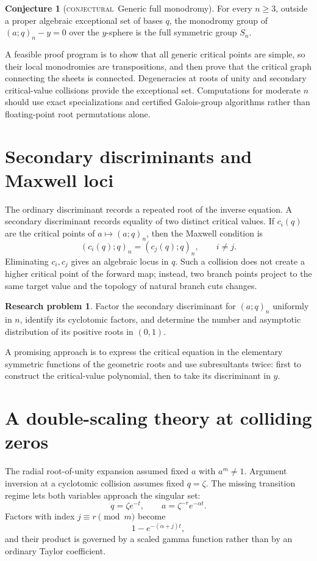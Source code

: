 \documentclass[11pt,letterpaper,oneside,openany]{book}
\theoremstyle{definition}
\newtheorem{researchproblem}[theorem]{Research problem}
\newtheorem{conjecture}[theorem]{Conjecture}
\theoremstyle{remark}
\newcommand{\statusconjectural}{\textcolor{conjectureorange}{\textsc{conjectural}}}
\begin{document}
\begin{conjecture}[\statusconjectural\ Generic full monodromy]
For every \(n\ge3\), outside a proper algebraic exceptional set of bases \(q\),
the monodromy group of \((a;q)_n-y=0\) over the \(y\)-sphere is the full
symmetric group \(S_n\).
\end{conjecture}
A feasible proof program is to show that all generic critical points are
simple, so their local monodromies are transpositions, and then prove that the
critical graph connecting the sheets is connected.  Degeneracies at roots of
unity and secondary critical-value collisions provide the exceptional set.
Computations for moderate \(n\) should use exact specializations and certified
Galois-group algorithms rather than floating-point root permutations alone.

\section{Secondary discriminants and Maxwell loci}
The ordinary discriminant records a repeated root of the inverse equation.  A
secondary discriminant records equality of two distinct critical values.  If
\(c_i(q)\) are the critical points of \(a\mapsto(a;q)_n\), then the Maxwell
condition is
\[
 (c_i(q);q)_n=(c_j(q);q)_n,
 \qquad i\ne j.
\]
Eliminating \(c_i,c_j\) gives an algebraic locus in \(q\).  Such a collision
does not create a higher critical point of the forward map; instead, two branch
points project to the same target value and the topology of natural branch
cuts changes.

\begin{researchproblem}
Factor the secondary discriminant for \((a;q)_n\) uniformly in \(n\), identify
its cyclotomic factors, and determine the number and asymptotic distribution of
its positive roots in \((0,1)\).
\end{researchproblem}
A promising approach is to express the critical equation in the elementary
symmetric functions of the geometric roots and use subresultants twice: first
to construct the critical-value polynomial, then to take its discriminant in
\(y\).

\section{A double-scaling theory at colliding zeros}
The radial root-of-unity expansion assumed fixed \(a\) with \(a^m\ne1\).
Argument inversion at a cyclotomic collision assumes fixed \(q=\zeta\).  The
missing transition regime lets both variables approach the singular set:
\[
 q=\zeta e^{-t},
 \qquad
 a=\zeta^{-r}e^{-\alpha t}.
\]
Factors with index \(j\equiv r\pmod m\) become
\[
 1-e^{-(\alpha+j)t},
\]
and their product is governed by a scaled gamma function rather than by an
ordinary Taylor coefficient.
\end{document}
